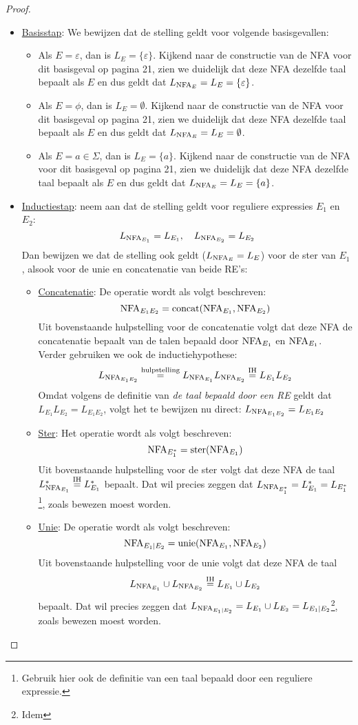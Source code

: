 \documentclass[../aanvullingen_cursus.tex]{subfiles}
\begin{document}
\begin{proof}
	\begin{itemize}
		\item \underline{Basisstap}:
		We bewijzen dat de stelling geldt voor volgende basisgevallen:
		\begin{itemize}
			\item Als \( E=\varepsilon \), dan is \(L_E=\{\varepsilon\}\). Kijkend naar de constructie van de NFA voor dit basisgeval op pagina 21, zien we duidelijk dat deze NFA dezelfde taal bepaalt als \(E\) en dus geldt dat \(L_{\text{NFA}_E}=L_E=\{\varepsilon\}\).
			\item Als \( E=\phi \), dan is \(L_E=\emptyset\). Kijkend naar de constructie van de NFA voor dit basisgeval op pagina 21, zien we duidelijk dat deze NFA dezelfde taal bepaalt als \(E\) en dus geldt dat \(L_{\text{NFA}_E}=L_E=\emptyset\).
			\item Als \( E=a \in \Sigma \), dan is \(L_E=\{a\}\). Kijkend naar de constructie van de NFA voor dit basisgeval op pagina 21, zien we duidelijk dat deze NFA dezelfde taal bepaalt als \(E\) en dus geldt dat \(L_{\text{NFA}_E}=L_E=\{a\}\).
		\end{itemize}
		\item \underline{Inductiestap}: neem aan dat de stelling geldt voor reguliere expressies \(E_1\) en \(E_2\): \[ L_{\text{NFA}_{E_1}} = L_{E_1}, \quad L_{\text{NFA}_{E_2}} = L_{E_2} \] Dan bewijzen we dat de stelling ook geldt (\( L_{\text{NFA}_E}=L_E \)) voor de ster van \(E_1\), alsook voor de unie en concatenatie van beide RE's:
		\begin{itemize}
			\item \underline{Concatenatie}: De operatie wordt als volgt beschreven: \[ \text{NFA}_{E_1E_2}=\operatorname*{concat}(\text{NFA}_{E_1},\text{NFA}_{E_2}) \] Uit bovenstaande hulpstelling voor de concatenatie volgt dat deze NFA de concatenatie bepaalt van de talen bepaald door \( \text{NFA}_{E_1} \) en \( \text{NFA}_{E_1} \). Verder gebruiken we ook de inductiehypothese: \[L_{\text{NFA}_{E_1E_2}} \overset{\text{hulpstelling}}{=} L_{\text{NFA}_{E_1}}L_{\text{NFA}_{E_2}} \overset{\text{IH}}{=} L_{E_1}L_{E_2}\] Omdat volgens de definitie van \textit{de taal bepaald door een RE} geldt dat \(L_{E_1}L_{E_2}=L_{E_1E_2}\), volgt het te bewijzen nu direct: \( L_{\text{NFA}_{E_1E_2}}=L_{E_1E_2} \)
			\item \underline{Ster}: Het operatie wordt als volgt beschreven: \[ \text{NFA}_{E_1^*}=\operatorname*{ster}(\text{NFA}_{E_1}) \] Uit bovenstaande hulpstelling voor de ster volgt dat deze NFA de taal \(L_{\text{NFA}_{E_1}}^* \overset{\text{IH}}{=} L_{E_1}^*\) bepaalt. Dat wil precies zeggen dat \(L_{\text{NFA}_{E_1^*}}=L_{E_1}^*=L_{E_1^*}\)\footnote{Gebruik hier ook de definitie van een taal bepaald door een reguliere expressie.}, zoals bewezen moest worden.
			\item \underline{Unie}: De operatie wordt als volgt beschreven: \[ \text{NFA}_{E_1|E_2}=\operatorname*{unie}(\text{NFA}_{E_1},\text{NFA}_{E_2}) \] Uit bovenstaande hulpstelling voor de unie volgt dat deze NFA de taal \[L_{\text{NFA}_{E_1}}\cup L_{\text{NFA}_{E_2}} \overset{\text{IH}}{=} L_{E_1} \cup L_{E_2}\] bepaalt. Dat wil precies zeggen dat \(L_{\text{NFA}_{E_1|E_2}}=L_{E_1} \cup L_{E_2}=L_{E_1 | E_2}\)\footnote{Idem}, zoals bewezen moest worden.
		\end{itemize}
	\end{itemize}

\end{proof}
\end{document}
